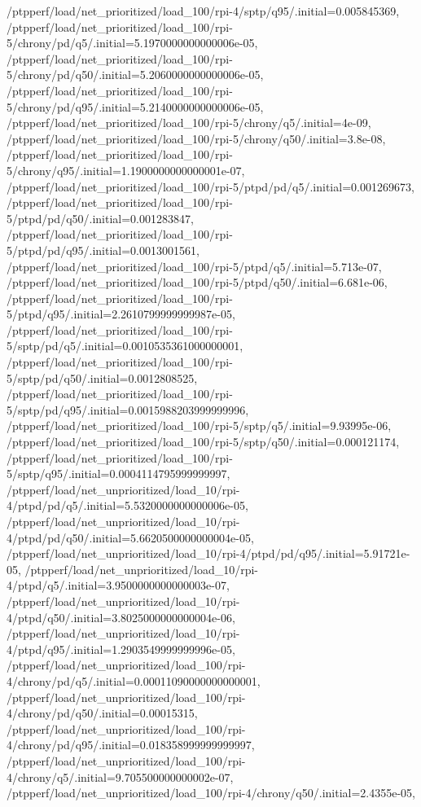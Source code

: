 {    /ptpperf/load/net_prioritized/load_100/rpi-4/sptp/q95/.initial=0.005845369,
    /ptpperf/load/net_prioritized/load_100/rpi-5/chrony/pd/q5/.initial=5.1970000000000006e-05,
    /ptpperf/load/net_prioritized/load_100/rpi-5/chrony/pd/q50/.initial=5.2060000000000006e-05,
    /ptpperf/load/net_prioritized/load_100/rpi-5/chrony/pd/q95/.initial=5.2140000000000006e-05,
    /ptpperf/load/net_prioritized/load_100/rpi-5/chrony/q5/.initial=4e-09,
    /ptpperf/load/net_prioritized/load_100/rpi-5/chrony/q50/.initial=3.8e-08,
    /ptpperf/load/net_prioritized/load_100/rpi-5/chrony/q95/.initial=1.1900000000000001e-07,
    /ptpperf/load/net_prioritized/load_100/rpi-5/ptpd/pd/q5/.initial=0.001269673,
    /ptpperf/load/net_prioritized/load_100/rpi-5/ptpd/pd/q50/.initial=0.001283847,
    /ptpperf/load/net_prioritized/load_100/rpi-5/ptpd/pd/q95/.initial=0.0013001561,
    /ptpperf/load/net_prioritized/load_100/rpi-5/ptpd/q5/.initial=5.713e-07,
    /ptpperf/load/net_prioritized/load_100/rpi-5/ptpd/q50/.initial=6.681e-06,
    /ptpperf/load/net_prioritized/load_100/rpi-5/ptpd/q95/.initial=2.2610799999999987e-05,
    /ptpperf/load/net_prioritized/load_100/rpi-5/sptp/pd/q5/.initial=0.0010535361000000001,
    /ptpperf/load/net_prioritized/load_100/rpi-5/sptp/pd/q50/.initial=0.0012808525,
    /ptpperf/load/net_prioritized/load_100/rpi-5/sptp/pd/q95/.initial=0.0015988203999999996,
    /ptpperf/load/net_prioritized/load_100/rpi-5/sptp/q5/.initial=9.93995e-06,
    /ptpperf/load/net_prioritized/load_100/rpi-5/sptp/q50/.initial=0.000121174,
    /ptpperf/load/net_prioritized/load_100/rpi-5/sptp/q95/.initial=0.0004114795999999997,
    /ptpperf/load/net_unprioritized/load_10/rpi-4/ptpd/pd/q5/.initial=5.5320000000000006e-05,
    /ptpperf/load/net_unprioritized/load_10/rpi-4/ptpd/pd/q50/.initial=5.6620500000000004e-05,
    /ptpperf/load/net_unprioritized/load_10/rpi-4/ptpd/pd/q95/.initial=5.91721e-05,
    /ptpperf/load/net_unprioritized/load_10/rpi-4/ptpd/q5/.initial=3.9500000000000003e-07,
    /ptpperf/load/net_unprioritized/load_10/rpi-4/ptpd/q50/.initial=3.8025000000000004e-06,
    /ptpperf/load/net_unprioritized/load_10/rpi-4/ptpd/q95/.initial=1.2903549999999996e-05,
    /ptpperf/load/net_unprioritized/load_100/rpi-4/chrony/pd/q5/.initial=0.00011090000000000001,
    /ptpperf/load/net_unprioritized/load_100/rpi-4/chrony/pd/q50/.initial=0.00015315,
    /ptpperf/load/net_unprioritized/load_100/rpi-4/chrony/pd/q95/.initial=0.018358999999999997,
    /ptpperf/load/net_unprioritized/load_100/rpi-4/chrony/q5/.initial=9.705500000000002e-07,
    /ptpperf/load/net_unprioritized/load_100/rpi-4/chrony/q50/.initial=2.4355e-05,
}
